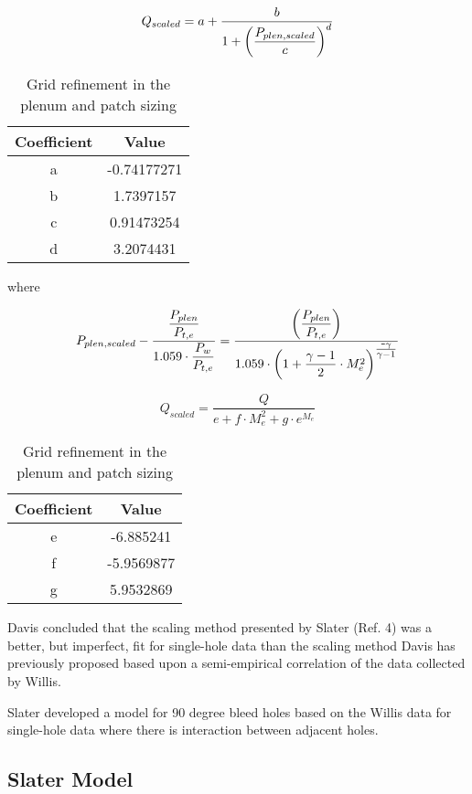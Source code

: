 
$$ Q_{scaled} = a + \dfrac{b}{1+\qty(\dfrac{P_{plen,scaled}}{c})^d} $$

\begin{table}[!htbp] \centering 
\begin{tabular}[c]{*{2}{|c}|} \hline
\textbf{Coefficient} & \textbf{Value}   \\ \hline
a   & -0.74177271 \\ \hline
b   &  1.7397157  \\ \hline
c   &  0.91473254 \\ \hline
d   &  3.2074431  \\ \hline
\end{tabular} 
\caption{Grid refinement in the plenum and patch sizing} 
\label{tab:davis1} \end{table}

where 

$$ P_{plen,scaled} - \frac{\dfrac{P_{plen}}{P_{t,e}}}{1.059\cdot\dfrac{P_w}{P_{t,e}}} = \dfrac{\qty(\dfrac{P_{plen}}{P_{t,e}})}{1.059 \cdot \qty(1+\dfrac{\gamma-1}{2}\cdot M^2_e)^{\textstyle\frac{\texttt{-}\gamma}{\gamma-1}}} $$

$$ Q_{scaled} = \dfrac{Q}{e + f\cdot M_e^2 + g \cdot e^{M_e}} $$

\begin{table}[!htbp] \centering 
\begin{tabular}[c]{*{2}{|c}|} \hline
\textbf{Coefficient} & \textbf{Value}   \\ \hline
e   & -6.885241  \\ \hline
f   & -5.9569877 \\ \hline
g   &  5.9532869 \\ \hline
\end{tabular} 
\caption{Grid refinement in the plenum and patch sizing} 
\label{tab:davis2} \end{table}

Davis \cite{Davis2012} concluded that the scaling method presented by Slater (Ref. 4) was a better, but imperfect, fit for single-hole data than the scaling method Davis has previously proposed based upon a semi-empirical correlation of the data collected by Willis.


Slater \cite{Slater2009} developed a model for 90 degree bleed holes based on the Willis data for single-hole data where there is interaction between adjacent holes.


\subsection{Slater Model}

